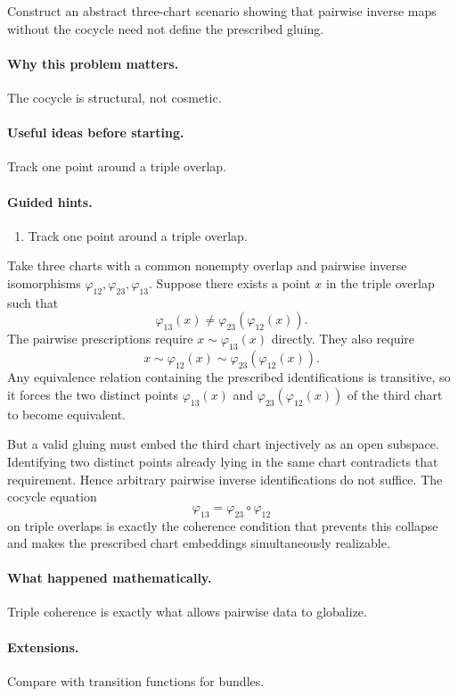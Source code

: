 \begin{problem}\label{prob:vi20-p18}
Construct an abstract three-chart scenario showing that pairwise inverse maps without the cocycle need not define the prescribed gluing.
\end{problem}

\ifdefined\FullProblemDossiers
\paragraph{Why this problem matters.}
The cocycle is structural, not cosmetic.

\paragraph{Useful ideas before starting.}
Track one point around a triple overlap.

\paragraph{Guided hints.}
\begin{enumerate}
\item Track one point around a triple overlap.
\end{enumerate}

\begin{solution}
Take three charts with a common nonempty overlap and pairwise inverse isomorphisms $\varphi_{12},\varphi_{23},\varphi_{13}$.  Suppose there exists a point $x$ in the triple overlap such that
\[
\varphi_{13}(x)\neq\varphi_{23}(\varphi_{12}(x)).
\]
The pairwise prescriptions require $x\sim\varphi_{13}(x)$ directly.  They also require
\[
x\sim\varphi_{12}(x)\sim\varphi_{23}(\varphi_{12}(x)).
\]
Any equivalence relation containing the prescribed identifications is transitive, so it forces the two distinct points
$\varphi_{13}(x)$ and $\varphi_{23}(\varphi_{12}(x))$ of the third chart to become equivalent.

But a valid gluing must embed the third chart injectively as an open subspace.  Identifying two distinct points already lying in the same chart contradicts that requirement.  Hence arbitrary pairwise inverse identifications do not suffice.  The cocycle equation
\[
\varphi_{13}=\varphi_{23}\circ\varphi_{12}
\]
on triple overlaps is exactly the coherence condition that prevents this collapse and makes the prescribed chart embeddings simultaneously realizable.
\end{solution}


\paragraph{What happened mathematically.}
Triple coherence is exactly what allows pairwise data to globalize.

\paragraph{Extensions.}
Compare with transition functions for bundles.
\fi
